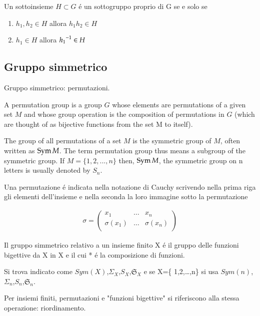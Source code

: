 \documentclass[oneside,12pt]{memoir}
\begin{document}
Un sottoinsieme $H\subset G$ \'e un sottogruppo proprio di G se e solo se
\begin{enumerate}
\item $h_1, h_2\in H$ allora $h_1h_2\in H$
\item $h_1\in H$ allora ${{h_1}^{-1}}\in H$
\end{enumerate}

\subsection{Gruppo simmetrico}

\begin{definition}{Gruppo simmetrico: permutazioni.}

A permutation group is a group $G$ whose elements are permutations of a given set $M$ and whose group operation is the composition of permutations in $G$ (which are thought of as bijective functions from the set M to itself). 

The group of all permutations of a set $M$ is the symmetric group of $M$, often written as $\operatorname{Sym}{M}$. The term permutation group thus means a subgroup of the symmetric group. If $M = \{1,2,...,n\}$ then, $\operatorname{Sym}{M}$, the symmetric group on n letters is usually denoted by $S_n$.

Una permutazione \'e indicata nella notazione di Cauchy scrivendo nella prima riga gli elementi dell'insieme e nella seconda la loro immagine sotto la permutazione

\begin{align*}
\sigma=
\begin{pmatrix}
x_1&\ldots&x_n\\
\sigma(x_1)&\ldots&\sigma(x_n)\\
\end{pmatrix}
\end{align*}

Il gruppo simmetrico relativo a un insieme finito X \'e il gruppo delle funzioni bigettive da X in X e il cui * \'e la composizione di funzioni.

Si trova indicato come $Sym(X)$,$\Sigma_X$,$S_X$,$\mathfrak{S}_X$ e se X=\{ 1,2,\ldots ,n\} si usa $Sym(n)$,$\Sigma_n$,$S_n$,$\mathfrak{S}_n$.

Per insiemi finiti, permutazioni e "funzioni bigettive" si riferiscono alla stessa operazione: riordinamento.
\end{definition}
\end{document}

